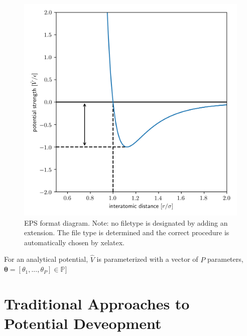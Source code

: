 \begin{figure}[htbp]
  \centering
    \includegraphics[width=5in]{chapter3/lj}
    \caption[EPS format diagram. Note: no filetype is designated by adding an extension.]{EPS format diagram. Note: no filetype is designated by adding an extension. The file type is determined and the correct procedure is automatically chosen by xelatex.}
\end{figure}

For an analytical potential, $\hat{V}$ is parameterized with a vector of $P$ parameters, $\bm{\theta} = [\theta_1,...,\theta_P] \in \mathbb{P}]$
\section{Traditional Approaches to Potential Deveopment}

